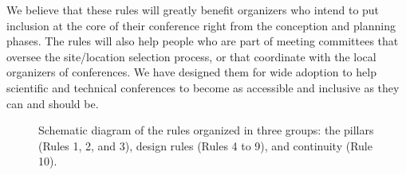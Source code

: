 \documentclass[10pt,letterpaper]{article}
\begin{document}
We believe that these rules will greatly benefit organizers who intend to put inclusion at the core of their conference right from the conception and planning phases.
The rules will also help people who are part of meeting committees that oversee the site/location selection process, or that coordinate with the local organizers of conferences. 
We have designed them for wide adoption to help scientific and technical conferences to become as accessible and inclusive as they can and should be.




\begin{figure}[!h]
\centering
\caption{Schematic diagram of the rules organized in three groups: the pillars (Rules 1, 2, and 3), design rules (Rules 4 to 9), and continuity (Rule 10).}
\label{fig:diagram}
\end{figure}
\end{document}
